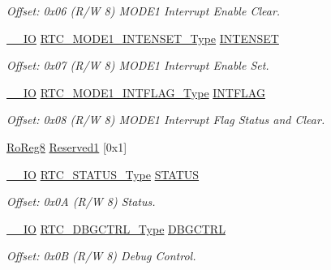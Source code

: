 \begin{DoxyCompactItemize}
\begin{DoxyCompactList}\small\item\em Offset\+: 0x06 (R/W 8) M\+O\+D\+E1 Interrupt Enable Clear. \end{DoxyCompactList}\item 
\mbox{\hyperlink{core__cm0plus_8h_aec43007d9998a0a0e01faede4133d6be}{\+\_\+\+\_\+\+IO}} \mbox{\hyperlink{union_r_t_c___m_o_d_e1___i_n_t_e_n_s_e_t___type}{R\+T\+C\+\_\+\+M\+O\+D\+E1\+\_\+\+I\+N\+T\+E\+N\+S\+E\+T\+\_\+\+Type}} \mbox{\hyperlink{struct_rtc_mode1_a3c738715c84f2e64ffdb4e522423fc2b}{I\+N\+T\+E\+N\+S\+ET}}
\begin{DoxyCompactList}\small\item\em Offset\+: 0x07 (R/W 8) M\+O\+D\+E1 Interrupt Enable Set. \end{DoxyCompactList}\item 
\mbox{\hyperlink{core__cm0plus_8h_aec43007d9998a0a0e01faede4133d6be}{\+\_\+\+\_\+\+IO}} \mbox{\hyperlink{union_r_t_c___m_o_d_e1___i_n_t_f_l_a_g___type}{R\+T\+C\+\_\+\+M\+O\+D\+E1\+\_\+\+I\+N\+T\+F\+L\+A\+G\+\_\+\+Type}} \mbox{\hyperlink{struct_rtc_mode1_ad4ea2caf2becf706915e27b1b952effd}{I\+N\+T\+F\+L\+AG}}
\begin{DoxyCompactList}\small\item\em Offset\+: 0x08 (R/W 8) M\+O\+D\+E1 Interrupt Flag Status and Clear. \end{DoxyCompactList}\item 
\mbox{\hyperlink{group___s_a_m_d21_e15_a__definitions_ga0d957f1433aaf5d70e4dc2b68288442d}{Ro\+Reg8}} \mbox{\hyperlink{struct_rtc_mode1_a092866123ac46d0985136e4dca2f36f4}{Reserved1}} \mbox{[}0x1\mbox{]}
\item 
\mbox{\hyperlink{core__cm0plus_8h_aec43007d9998a0a0e01faede4133d6be}{\+\_\+\+\_\+\+IO}} \mbox{\hyperlink{union_r_t_c___s_t_a_t_u_s___type}{R\+T\+C\+\_\+\+S\+T\+A\+T\+U\+S\+\_\+\+Type}} \mbox{\hyperlink{struct_rtc_mode1_a18fb82dd8352b8ac5b64e276ab0b5268}{S\+T\+A\+T\+US}}
\begin{DoxyCompactList}\small\item\em Offset\+: 0x0A (R/W 8) Status. \end{DoxyCompactList}\item 
\mbox{\hyperlink{core__cm0plus_8h_aec43007d9998a0a0e01faede4133d6be}{\+\_\+\+\_\+\+IO}} \mbox{\hyperlink{union_r_t_c___d_b_g_c_t_r_l___type}{R\+T\+C\+\_\+\+D\+B\+G\+C\+T\+R\+L\+\_\+\+Type}} \mbox{\hyperlink{struct_rtc_mode1_a291f72f633a731e348a16601bc63a11a}{D\+B\+G\+C\+T\+RL}}
\begin{DoxyCompactList}\small\item\em Offset\+: 0x0B (R/W 8) Debug Control. \end{DoxyCompactList}\item 

\end{DoxyCompactItemize}
